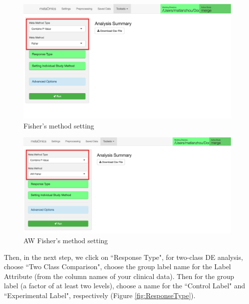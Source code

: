\begin{figure}[H]
\begin{center}
\includegraphics[scale=0.45]{./figure/metaDE/FisherSelect}
\caption{Fisher's method setting}
\label{fig:FisherSelect}
\end{center}
\end{figure}

\begin{figure}[H]
\begin{center}
\includegraphics[scale=0.45]{./figure/metaDE/AWFisherSelect}
\caption{AW Fisher's method setting}
\label{fig:AWFisherSelect}
\end{center}
\end{figure}

Then, in the next step, we click on ``Response Type", for two-class DE analysis, choose ``Two Class Comparison", choose the group label name for the Label Attribute (from the column names of your clinical data). Then for the group label (a factor of at least two levels), choose a name for the ``Control Label" and ``Experimental Label", respectively (Figure \ref{fig:ResponseType}).


